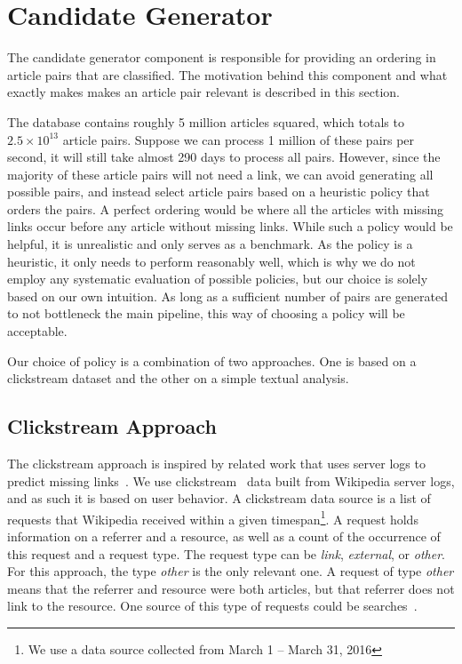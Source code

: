 \section{Candidate Generator}

The candidate generator component is responsible for providing an ordering in article pairs that are classified. The motivation behind this component and what exactly makes makes an article pair relevant is described in this section.

The database contains roughly 5 million articles squared, which totals to $2.5 \times 10^{13}$ article pairs. Suppose we can process 1 million of these pairs per second, it will still take almost 290 days to process all pairs.  However, since the majority of these article pairs will not need a link, we can avoid generating all possible pairs, and instead select article pairs based on a heuristic policy that orders the pairs. A perfect ordering would be where all the articles with missing links occur before any article without missing links. While such a policy would be helpful, it is unrealistic and only serves as a benchmark. As the policy is a heuristic, it only needs to perform reasonably well, which is why we do not employ any systematic evaluation of possible policies, but our choice is solely based on our own intuition. As long as a sufficient number of pairs are generated to not bottleneck the main pipeline, this way of choosing a policy will be acceptable.

Our choice of policy is a combination of two approaches. One is based on a clickstream dataset and the other on a simple textual analysis.

\subsection{Clickstream Approach}

The clickstream approach is inspired by related work that uses server logs to predict missing links~\cite{hyperlink-structure-using-logs}. We use clickstream~\cite{wiki-clickstream} data built from Wikipedia server logs, and as such it is based on user behavior. A clickstream data source is a list of requests that Wikipedia received within a given timespan\footnote{We use a data source collected from March 1 -- March 31, 2016}. A request holds information on a referrer and a resource, as well as a count of the occurrence of this request and a request type. The request type can be \emph{link}, \emph{external}, or \emph{other}. For this approach, the type \emph{other} is the only relevant one. A request of type \emph{other} means that the referrer and resource were both articles, but that referrer does not link to the resource. One source of this type of requests could be searches~\cite{wiki-clickstream}.

